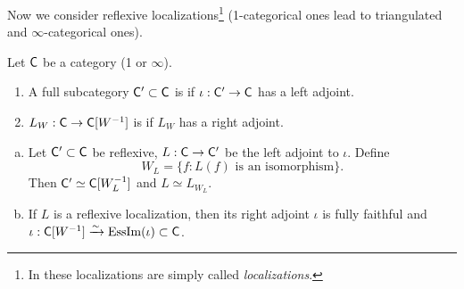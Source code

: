 Now we consider reflexive localizations\footnote{In \cite{htt} these localizations are
simply called \textit{localizations}.}
(1-categorical ones lead to triangulated and
$\infty$-categorical ones).
\begin{definition}
Let $\mathsf{C}$ be a category (1 or $\infty$).
\begin{enumerate}[1)]
\item A full subcategory $\mathsf{C}'\subset \mathsf{C}$ is  if $\iota:\C'\to \C$ has a
left adjoint.
\item $L_W:\C\to \C[W^{-1}]$ is  if $L_W$ has a right adjoint.
\end{enumerate}
\end{definition}

\begin{lemma} \leavevmode
\begin{enumerate}[a)]
\item Let $\mathsf{C}'\subset \mathsf{C}$ be reflexive, $L:\C\to \C'$ be the left adjoint to $\iota$. Define
\[
W_L=\{f:L(f)\text{ is an isomorphism}\}.
\]
Then $\mathsf{C}'\simeq \mathsf{C}[W_L^{-1}]$ and $L\simeq L_{W_L}$.
\item If $L$ is a reflexive localization, then its right adjoint $\iota$ is fully
faithful and $\iota:\mathsf{C}[W^{-1}] \xrightarrow{\sim} \operatorname{EssIm}(\iota)\subset \mathsf{C}$.
\end{enumerate}
\end{lemma}

